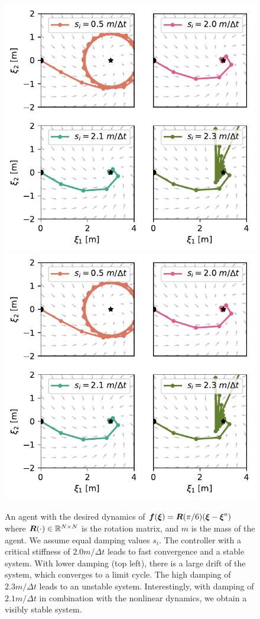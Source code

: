 \begin{figure}[htbp]
\centering
\ifthesis
  \includegraphics[width=.7\columnwidth]{figures/discrete_controller_parameters_comparison_stable}
  \else
  \includegraphics[width=\columnwidth]{figures/discrete_controller_parameters_comparison_stable}
  \fi
\caption{An agent with the desired dynamics of
$\boldsymbol{f}(\boldsymbol{\xi}) = \boldsymbol{R}(\pi / 6) (\boldsymbol{\xi}  - \boldsymbol{\xi}^a)$ where $\boldsymbol{R}(\cdot) \in \mathbb{R}^{N \times N}$ is the rotation matrix, and $m$ is the mass of the agent. We assume equal damping values $s_i$.
The controller with a critical stiffness of $2.0 m / \Delta t$ leads to fast convergence and a stable system. With lower damping (top left), there is a large drift of the system, which converges to a limit cycle. 
The high damping of $2.3 m / \Delta t$ leads to an unstable system. 
Interestingly, with damping of $2.1 m / \Delta t$ in combination with the nonlinear dynamics, we obtain a visibly stable system.}
  \label{fig:discrete_controller_parameters_comparison_stable}
\end{figure}

